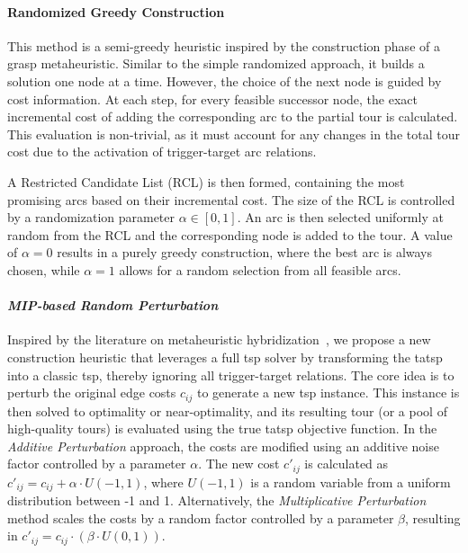 \documentclass[twocolumn, switch]{article} %
\begin{document}
\paragraph{Randomized Greedy Construction}
This method is a semi-greedy heuristic inspired by the construction phase of a \gls{grasp} metaheuristic. Similar to the simple randomized approach, it builds a solution one node at a time. However, the choice of the next node is guided by cost information. At each step, for every feasible successor node, the exact incremental cost of adding the corresponding arc to the partial tour is calculated. This evaluation is non-trivial, as it must account for any changes in the total tour cost due to the activation of trigger-target arc relations.

A Restricted Candidate List (RCL) is then formed, containing the most promising arcs based on their incremental cost. The size of the RCL is controlled by a randomization parameter $\alpha \in [0, 1]$. An arc is then selected uniformly at random from the RCL and the corresponding node is added to the tour. A value of $\alpha = 0$ results in a purely greedy construction, where the best arc is always chosen, while $\alpha = 1$ allows for a random selection from all feasible arcs.
  
\paragraph{\textit{MIP-based Random Perturbation}}
Inspired by the literature on metaheuristic hybridization~\cite{Blum2016}, we propose a new construction heuristic that leverages a full \gls{tsp} solver by transforming the \gls{tatsp} into a classic \gls{tsp}, thereby ignoring all trigger-target relations.
The core idea is to perturb the original edge costs $c_{ij}$ to generate a new \gls{tsp} instance.
This instance is then solved to optimality or near-optimality, and its resulting tour (or a pool of high-quality tours) is evaluated using the true \gls{tatsp} objective function.
In the \textit{Additive Perturbation} approach, the costs are modified using an additive noise factor controlled by a parameter $\alpha$. The new cost $c'_{ij}$ is calculated as $c'_{ij} = c_{ij} + \alpha \cdot U(-1, 1)$, where $U(-1, 1)$ is a random variable from a uniform distribution between -1 and 1. Alternatively, the \textit{Multiplicative Perturbation} method scales the costs by a random factor controlled by a parameter $\beta$, resulting in $c'_{ij} = c_{ij} \cdot (\beta \cdot U(0, 1))$.
  
\end{document}
